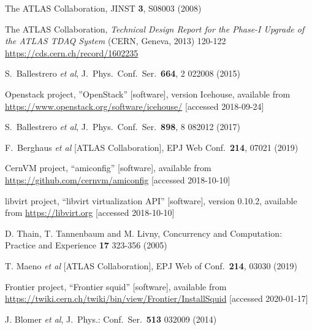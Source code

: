 \documentclass{webofc}
\begin{document}
\begin{thebibliography}{}
   The ATLAS Collaboration,
   JINST \textbf{3}, S08003 (2008)

    The ATLAS Collaboration, \textit{Technical Design Report for the Phase-I
    Upgrade of the ATLAS TDAQ System} (CERN, Geneva, 2013) 120-122
    \url{https://cds.cern.ch/record/1602235}

    S.~Ballestrero \textit{et al},
    J.\ Phys.\ Conf.\ Ser.\  \textbf{664}, 2 022008 (2015)

    Openstack project, ”OpenStack” [software], version Icehouse, available from
    \url{https://www.openstack.org/software/icehouse/} [accessed 2018-09-24]

    S.~Ballestrero \textit{et al},
    J.\ Phys.\ Conf.\ Ser.\  \textbf{898},  8 082012 (2017)

    F.~Berghaus \textit{et al} [ATLAS Collaboration],
    EPJ Web Conf.\ \textbf{214}, 07021 (2019)

    CernVM project, ``amiconfig'' [software], available from
    \url{https://github.com/cernvm/amiconfig} [accessed 2018-10-10]

    libvirt project, ``libvirt virtualization API'' [software], version 0.10.2,
    available from \url{https://libvirt.org} [accessed 2018-10-10]

    D. Thain, T. Tannenbaum and M. Livny,
    Concurrency and Computation: Practice and Experience \textbf{17} 323-356
    (2005)

    T. Maeno \textit{et al} [ATLAS Collaboration],
    EPJ Web of Conf.\ \textbf{214}, 03030 (2019)

    Frontier project, ``Frontier squid'' [software], available from
    \url{https://twiki.cern.ch/twiki/bin/view/Frontier/InstallSquid}
    [accessed 2020-01-17]

    J. Blomer \textit{et al},
    J.\ Phys.: Conf.\ Ser.\ \textbf{513} 032009 (2014)

\end{thebibliography}
\end{document}
